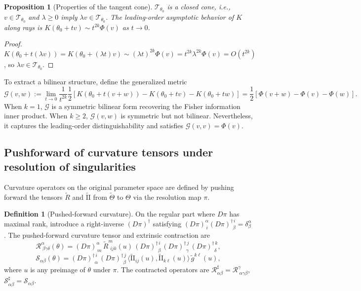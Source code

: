 \documentclass[11pt,letterpaper]{amsart}
\numberwithin{equation}{section}
\theoremstyle{plain}
\newtheorem{proposition}[theorem]{Proposition}
\theoremstyle{definition}
\newtheorem{definition}[theorem]{Definition}
\theoremstyle{remark}
\begin{document}
\begin{proposition}[Properties of the tangent cone]
$\mathcal{T}_{\theta_0}$ is a closed cone, i.e., $v \in \mathcal{T}_{\theta_0}$ and $\lambda \geq 0$ imply $\lambda v \in \mathcal{T}_{\theta_0}$. The leading-order asymptotic behavior of $K$ along rays is $K(\theta_0 + tv) \sim t^{2k}\Phi(v)$ as $t \to 0$.
\end{proposition}

\begin{proof}
$K(\theta_0 + t(\lambda v)) = K(\theta_0 + (\lambda t) v) \sim (\lambda t)^{2k}\Phi(v) = t^{2k}\lambda^{2k}\Phi(v) = O(t^{2k})$, so $\lambda v \in \mathcal{T}_{\theta_0}$.
\end{proof}

To extract a bilinear structure, define the generalized metric
\[
\mathcal{G}(v,w)
:=
\lim_{t \to 0} \frac{1}{t^{2k}} \frac{1}{2} \left[ K(\theta_0 + t(v+w)) - K(\theta_0 + tv) - K(\theta_0 + tw) \right]
=
\frac{1}{2}\left[\Phi(v+w) - \Phi(v) - \Phi(w)\right].
\]
When $k=1$, $\mathcal{G}$ is a symmetric bilinear form recovering the Fisher information inner product. When $k \geq 2$, $\mathcal{G}(v,w)$ is symmetric but not bilinear. Nevertheless, it captures the leading-order distinguishability and satisfies $\mathcal{G}(v,v) = \Phi(v)$.


\subsection{Pushforward of curvature tensors under resolution of singularities}

Curvature operators on the original parameter space are defined by pushing forward the tensors $\widetilde{R}$ and $\widetilde{\mathrm{II}}$ from $\widetilde{\Theta}$ to $\Theta$ via the resolution map $\pi$.

\begin{definition}[Pushed-forward curvature]
On the regular part where $D\pi$ has maximal rank, introduce a right-inverse $(D\pi)^{\dagger}$ satisfying
$(D\pi)^\alpha_{\, i} (D\pi)^{\dagger\, i}_{\ \ \beta} = \delta^\alpha_\beta$. The pushed-forward curvature tensor and extrinsic contraction are
\[
\mathcal{R}^\alpha_{\ \beta\gamma\delta}(\theta)
=
(D\pi)^\alpha_{\, m}
\, \widetilde{R}^m_{\ \, ijk}(u)
\, (D\pi)^{\dagger\, i}_{\ \ \beta}
\, (D\pi)^{\dagger\, j}_{\ \ \gamma}
\, (D\pi)^{\dagger\, k}_{\ \ \delta},
\]
\[
\mathcal{S}_{\alpha\beta}(\theta)
=
(D\pi)^{\dagger\, i}_{\ \ \alpha}
\, (D\pi)^{\dagger\, j}_{\ \ \beta}
\, \langle \widetilde{\mathrm{II}}_{ij}(u), \widetilde{\mathrm{II}}_{k\ell}(u) \rangle
\, \widetilde{g}^{k\ell}(u),
\]
where $u$ is any preimage of $\theta$ under $\pi$. The contracted operators are
$\mathcal{R}^\sharp_{\alpha\beta} = \mathcal{R}^\gamma_{\ \alpha\gamma\beta}$, $\mathcal{S}^\sharp_{\alpha\beta} = \mathcal{S}_{\alpha\beta}$.
\end{definition}
\end{document}
